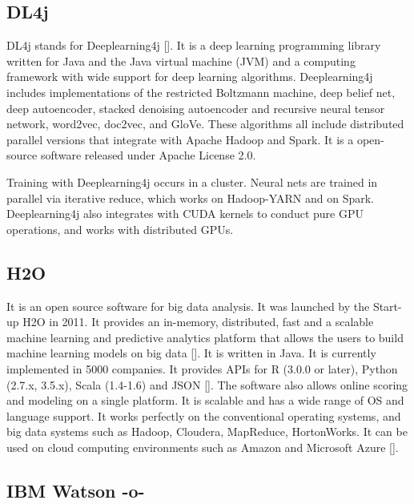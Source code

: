 \subsection{DL4j}

DL4j stands for Deeplearning4j [\cite{www-dl4j}]. It is a deep learning
programming library written for Java and the Java virtual machine
(JVM) and a computing framework with wide support for deep learning
algorithms. Deeplearning4j includes implementations of the restricted
Boltzmann machine, deep belief net, deep autoencoder, stacked
denoising autoencoder and recursive neural tensor network, word2vec,
doc2vec, and GloVe. These algorithms all include distributed parallel
versions that integrate with Apache Hadoop and Spark. It is a
open-source software released under Apache License 2.0.

Training with Deeplearning4j occurs in a cluster. Neural nets are
trained in parallel via iterative reduce, which works on Hadoop-YARN
and on Spark. Deeplearning4j also integrates with CUDA kernels to
conduct pure GPU operations, and works with distributed GPUs.
  
\subsection{H2O}

It is an open source software for big data analysis. It was launched
by the Start-up H2O in 2011. It provides an in-memory, distributed,
fast and a scalable machine learning and predictive analytics platform
that allows the users to build machine learning models on big data
[\cite{www-H2O-website}]. It is written in Java. It is currently
implemented in 5000 companies. It provides APIs for R (3.0.0 or
later), Python (2.7.x, 3.5.x), Scala (1.4-1.6) and JSON
[\cite{www-H2O-book}]. The software also allows online scoring and
modeling on a single platform.  It is scalable and has a wide range of
OS and language support. It works perfectly on the conventional
operating systems, and big data systems such as Hadoop, Cloudera,
MapReduce, HortonWorks.  It can be used on cloud computing
environments such as Amazon and Microsoft Azure [\cite{www-H2O-wiki}].


\subsection{IBM Watson -o-}

